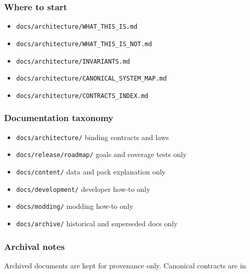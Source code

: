 \documentclass[9pt,a4paper,openany]{book}
\begin{document}
\subsubsection{Where to start}

\begin{itemize}
\item \texttt{docs/\allowbreak{}architecture/\allowbreak{}WHAT\_\allowbreak{}THIS\_\allowbreak{}IS.\allowbreak{}md}
\item \texttt{docs/\allowbreak{}architecture/\allowbreak{}WHAT\_\allowbreak{}THIS\_\allowbreak{}IS\_\allowbreak{}NOT.\allowbreak{}md}
\item \texttt{docs/\allowbreak{}architecture/\allowbreak{}INVARIANTS.\allowbreak{}md}
\item \texttt{docs/\allowbreak{}architecture/\allowbreak{}CANONICAL\_\allowbreak{}SYSTEM\_\allowbreak{}MAP.\allowbreak{}md}
\item \texttt{docs/\allowbreak{}architecture/\allowbreak{}CONTRACTS\_\allowbreak{}INDEX.\allowbreak{}md}
\end{itemize}

\subsubsection{Documentation taxonomy}

\begin{itemize}
\item \texttt{docs/\allowbreak{}architecture/\allowbreak{}} binding contracts and laws
\item \texttt{docs/\allowbreak{}release/\allowbreak{}roadmap/\allowbreak{}} goals and coverage tests only
\item \texttt{docs/\allowbreak{}content/\allowbreak{}} data and pack explanation only
\item \texttt{docs/\allowbreak{}development/\allowbreak{}} developer how-\allowbreak{}to only
\item \texttt{docs/\allowbreak{}modding/\allowbreak{}} modding how-\allowbreak{}to only
\item \texttt{docs/\allowbreak{}archive/\allowbreak{}} historical and superseded docs only
\end{itemize}

\subsubsection{Archival notes}

Archived documents are kept for provenance only.\allowbreak{} Canonical contracts are in
\end{document}

